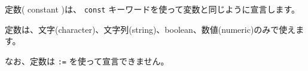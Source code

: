 定数( constant )は、 \texttt{const} キーワードを使って変数と同じように宣言します。

定数は、文字(character)、文字列(string)、boolean、数値(numeric)のみで使えます。

なお、定数は \texttt{:=} を使って宣言できません。